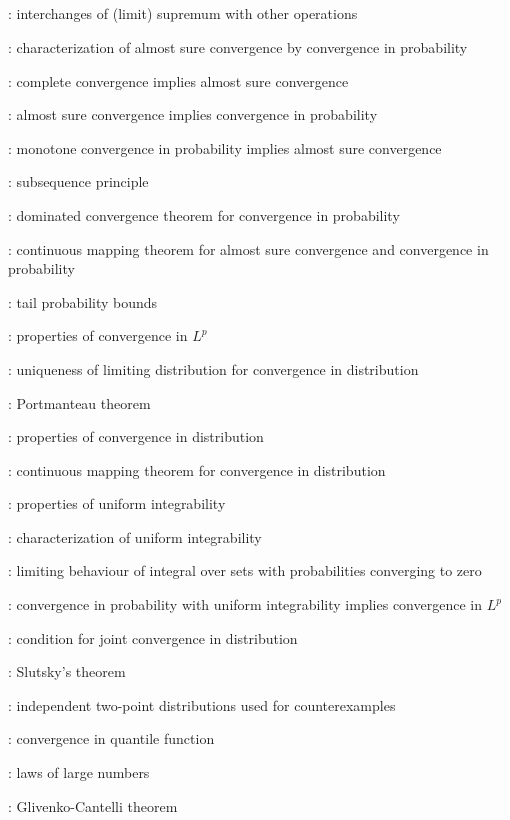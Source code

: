\subsection*{}
\item {}: interchanges of (limit) supremum with other operations
\item {}: characterization of almost sure convergence by convergence in probability
\item {}: complete convergence implies almost sure convergence
\item {}: almost sure convergence implies convergence in probability
\item {}: monotone convergence in probability implies almost sure convergence
\item {}: subsequence principle
\item {}: dominated convergence theorem for convergence in probability
\item {}: continuous mapping theorem for almost sure convergence and convergence in probability
\item {}: tail probability bounds
\item {}: properties of convergence in \(L^p\)
\item {}: uniqueness of limiting distribution for convergence in distribution
\item {}: Portmanteau theorem
\item {}: properties of convergence in distribution
\item {}: continuous mapping theorem for convergence in distribution
\item {}: properties of uniform integrability
\item {}: characterization of uniform integrability
\item {}: limiting behaviour of integral over sets with probabilities converging to zero
\item {}: convergence in probability with uniform integrability implies convergence in \(L^p\)
\item {}: condition for joint convergence in distribution
\item {}: Slutsky's theorem
\item {}: independent two-point distributions used for counterexamples
\item {}: convergence in quantile function
\item {}: laws of large numbers
\item {}: Glivenko-Cantelli theorem
